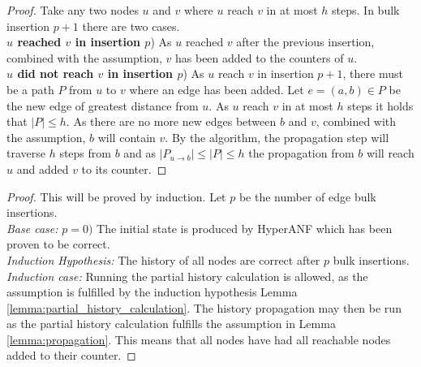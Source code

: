 \begin{theorem}
\begin{lemma}
\begin{proof}

\noindent Take any two nodes $u$ and $v$ where $u$ reach $v$ in at most $h$ steps. In bulk insertion $p+1$ there are two cases. \\

\noindent\textbf{$u$ reached $v$ in insertion $p$}) As $u$ reached $v$ after the previous insertion, combined with the assumption, $v$ has been added to the counters of $u$. \\

\noindent\textbf{$u$ did not reach $v$ in insertion $p$}) As $u$ reach $v$ in insertion $p+1$, there must be a path $P$ from $u$ to $v$ where an edge has been added. Let $e = (a,b) \in P$ be the new edge of greatest distance from $u$. As $u$ reach $v$ in at most $h$ steps it holds that $|P| \leq h$.
As there are no more new edges between $b$ and $v$, combined with the assumption, $b$ will contain $v$. By the algorithm, the propagation step will traverse $h$ steps from $b$ and as 
$|P_{u \rightarrow b}| \leq |P| \leq h$ the propagation from $b$ will reach $u$ and added $v$ to its counter. 

\end{proof}
\end{lemma}
\noindent{}

\begin{proof} This will be proved by induction. Let $p$ be the number of edge bulk insertions.\\

\noindent\textit{Base case:} $p = 0)$ The initial state is produced by HyperANF which has been proven to be correct.\\

\noindent\textit{Induction Hypothesis:} The history of all nodes are correct after $p$ bulk insertions.\\

\iffalse
Given that the history of all nodes are correct after insertion $p$, they will be correct after insertion $p+1$.\\
\fi

\noindent\textit{Induction case:}
Running the partial history calculation is allowed, as the assumption is fulfilled by the induction hypothesis Lemma \ref{lemma:partial_history_calculation}. The history propagation may then be run as the partial history calculation fulfills the assumption in Lemma \ref{lemma:propagation}. This means that all nodes have had all reachable nodes added to their counter.

\end{proof}
\end{theorem}










